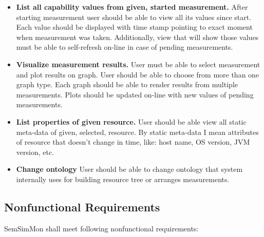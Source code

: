 \begin{itemize}
\item {\bf List all capability values from given, started measurement.}
After starting measurement user should be able to view all its values since start. Each value should be displayed with time stamp pointing to exact moment when measurement was taken. Additionally, view that will show those values must be able to self-refresh on-line in case of pending measurements.

\item {\bf Visualize measurement results.}
User must be able to select measurement and plot results on graph. User should be able to choose from more than one graph type. Each graph should be able to render results from multiple measurements. Plots should be updated on-line with new values of pending measurements.

\item {\bf List properties of given resource.}
User should be able view all static meta-data of given, selected, resource. By static meta-data I mean attributes of resource that doesn't change in time, like: host name, OS version, JVM version, etc.

\item {\bf Change ontology}
User should be able to change ontology that system internally uses for building resource tree or arranges measurements.

\end{itemize}

\subsection{Nonfunctional Requirements}
\label{subsec:NonFunctionalRequirements}

SemSimMon shall meet following nonfunctional requirements:

